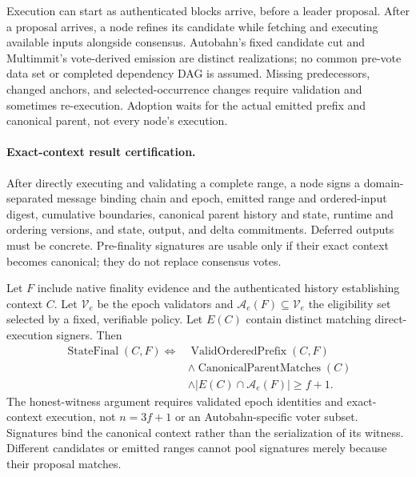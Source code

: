 


Execution can start as authenticated blocks arrive, before a leader proposal. After a proposal arrives, a node refines its candidate while fetching and executing available inputs alongside consensus. Autobahn's fixed candidate cut and Multimmit's vote-derived emission are distinct realizations; no common pre-vote data set or completed dependency DAG is assumed. Missing predecessors, changed anchors, and selected-occurrence changes require validation and sometimes re-execution. Adoption waits for the actual emitted prefix and canonical parent, not every node's execution.

\paragraph{Exact-context result certification.}
After directly executing and validating a complete range, a node signs a domain-separated message binding chain and epoch, emitted range and ordered-input digest, cumulative boundaries, canonical parent history and state, runtime and ordering versions, and state, output, and delta commitments. Deferred outputs must be concrete. Pre-finality signatures are usable only if their exact context becomes canonical; they do not replace consensus votes.

Let \(F\) include native finality evidence and the authenticated history establishing context \(C\). Let \(\mathcal V_e\) be the epoch validators and \(\mathcal A_e(F)\subseteq\mathcal V_e\) the eligibility set selected by a fixed, verifiable policy. Let \(E(C)\) contain distinct matching direct-execution signers. Then
\begin{equation}
\begin{aligned}
 \operatorname{StateFinal}(C,F)\iff{}&
 \operatorname{ValidOrderedPrefix}(C,F)\\
 &\land\operatorname{CanonicalParentMatches}(C)\\
 &\land|E(C)\cap\mathcal A_e(F)|\geq f+1.
\end{aligned}
\label{eq:finality}
\end{equation}
The honest-witness argument requires validated epoch identities and exact-context execution, not \(n=3f+1\) or an Autobahn-specific voter subset. Signatures bind the canonical context rather than the serialization of its witness. Different candidates or emitted ranges cannot pool signatures merely because their proposal matches.

